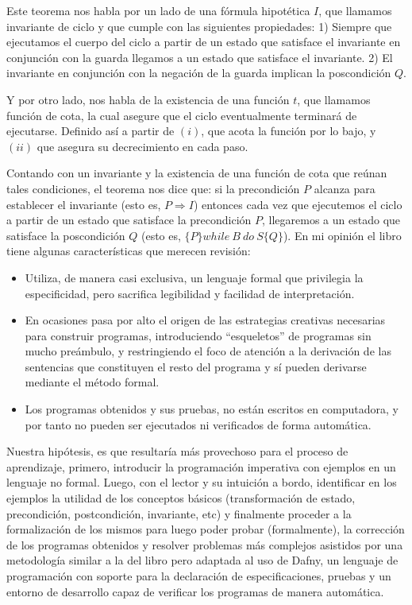 \documentclass[12pt, a4paper, openany, fleqn]{book}
\begin{document}
    Este teorema nos habla por un lado de una fórmula hipotética $I$, que llamamos invariante de ciclo y que cumple con las siguientes propiedades: 1) Siempre que ejecutamos el cuerpo del ciclo a partir de un estado que satisface el invariante en conjunción con la guarda llegamos a un estado que satisface el invariante. 2) El invariante en conjunción con la negación de la guarda implican la poscondición $Q$.

    Y por otro lado, nos habla de la existencia de una función $t$, que llamamos función de cota, la cual asegure que el ciclo eventualmente terminará de ejecutarse. Definido así a partir de $(i)$, que acota la función por lo bajo, y $(ii)$ que asegura su decrecimiento en cada paso.

    Contando con un invariante y la existencia de una función de cota que reúnan tales condiciones, el teorema nos dice que: si la precondición $P$ alcanza para establecer el invariante (esto es, $P \Rightarrow I$) entonces cada vez que ejecutemos el ciclo a partir de un estado que satisface la precondición $P$, llegaremos a un estado que satisface la poscondición $Q$ (esto es, $\{P\}while\ B\ do\ S\{Q\}$).
    En mi opinión el libro tiene algunas características que merecen revisión:
    \begin{itemize}
    \item Utiliza, de manera casi exclusiva, un lenguaje formal que privilegia la especificidad, pero sacrifica legibilidad y facilidad de interpretación.
    \item En ocasiones pasa por alto el origen de las estrategias creativas necesarias para construir programas, introduciendo ``esqueletos'' de programas sin mucho preámbulo, y restringiendo el foco de atención a la derivación de las sentencias que constituyen el resto del programa y sí pueden derivarse mediante el método formal.
    \item Los programas obtenidos y sus pruebas, no están escritos en computadora, y por tanto no pueden ser ejecutados ni verificados de forma automática.
    \end{itemize}

    Nuestra hipótesis, es que resultaría más provechoso para el proceso de aprendizaje, primero, introducir la programación imperativa con ejemplos en un lenguaje no formal. Luego, con el lector y su intuición a bordo, identificar en los ejemplos la utilidad de los conceptos básicos (transformación de estado, precondición, postcondición, invariante, etc) y finalmente proceder a la formalización de los mismos para luego poder probar (formalmente), la corrección de los programas obtenidos y resolver problemas más complejos asistidos por una metodología similar a la del libro pero adaptada al uso de Dafny, un lenguaje de programación con soporte para la declaración de especificaciones, pruebas y un entorno de desarrollo capaz de verificar los programas de manera automática.
\end{document}
